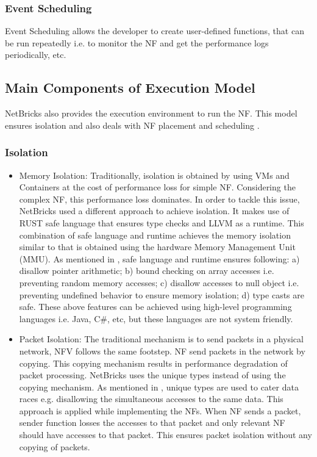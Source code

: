 \documentclass[10pt, a4paper, conference]{IEEEtran}
\begin{document}
\subsubsection{Event Scheduling}
Event Scheduling allows the developer to create user-defined functions, that can be run repeatedly i.e. to monitor the NF and get the performance logs periodically, etc.
\subsection{Main Components of Execution Model}
NetBricks also provides the execution environment to run the NF. This model ensures isolation and also deals with NF placement and scheduling \cite{Panda2016}.
\subsubsection{Isolation}
\begin{itemize}
\item Memory Isolation: Traditionally, isolation is obtained by using VMs and Containers at the cost of performance loss for simple NF. Considering the complex NF, this performance loss dominates. In order to tackle this issue, NetBricks used a different approach to achieve isolation. It makes use of RUST \cite{TheRustTeam2016} safe language that ensures type checks and LLVM \cite{Lattner} as a runtime. This combination of safe language and runtime achieves the memory isolation similar to that is obtained using the hardware Memory Management Unit (MMU). As mentioned in \cite{Panda2016}, safe language and runtime ensures following: a) disallow pointer arithmetic; b) bound checking on array accesses i.e. preventing random memory accesses; c) disallow accesses to null object i.e. preventing undefined behavior to ensure memory isolation; d) type casts are safe. These above features can be achieved using high-level programming languages i.e. Java, C\#, etc, but these languages are not system friendly. 
\item Packet Isolation: The traditional mechanism is to send packets in a physical network, NFV follows the same footstep. NF send packets in the network by copying. This copying mechanism results in performance degradation of packet processing. NetBricks uses the unique types \cite{Gordon} instead of using the copying mechanism. As mentioned in \cite{Panda2016}, unique types are used to cater data races e.g. disallowing the simultaneous accesses to the same data. This approach is applied while implementing the NFs. When NF sends a packet, sender function losses the accesses to that packet and only relevant NF should have accesses to that packet. This ensures packet isolation without any copying of packets.
\end{itemize}
\end{document}
